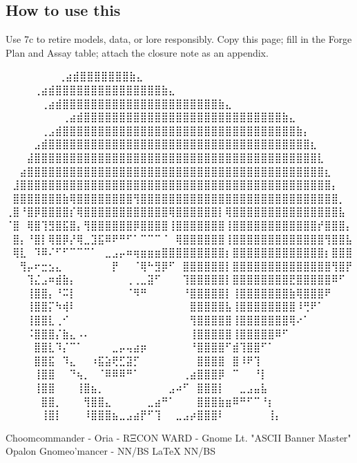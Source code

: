 \subsection*{How to use this}
Use 7c to retire models, data, or lore responsibly. Copy this page; fill in the Forge Plan and Assay table; attach the closure note as an appendix.
\iffalse

  ⠀⠀⠀⠀⠀             ⠀⠀⢀⣴⣾⣿⣿⣿⣿⣿⣿⣿⣷⣄⠀⠀⠀⠀⠀⠀⠀⠀
⠀⠀⠀  ⠀      ⠀⠀⠀⠀⢀⣴⣾⣿⣿⣿⣿⣿⣿⣿⣿⣿⣿⣿⣿⣿⣿⣿⣷⣄⠀⠀⠀⠀⠀⠀⠀⠀
⠀⠀ ⠀   ⠀⠀⠀⠀⠀⢀⣴⣾⣿⣿⣿⣿⣿⣿⣿⣿⣿⣿⣿⣿⣿⣿⣿⣿⣿⣿⣿⣿⣿⣿⣷⣄⠀⠀⠀⠀⠀⠀⠀⠀
⠀⠀⠀⠀⠀⠀⠀⠀⢀⣴⣾⣿⣿⣿⣿⣿⣿⣿⣿⣿⣿⣿⣿⣿⣿⣿⣿⣿⣿⣿⣿⣿⣿⣿⣿⣿⣿⣿⣿⣷⣄⠀⠀⠀⠀⠀⠀⠀⠀
⠀⠀⠀⠀⠀⢀⣠⣾⣿⣿⣿⣿⣿⣿⣿⣿⣿⣿⣿⣿⣿⣿⣿⣿⣿⣿⣿⣿⣿⣿⣿⣿⣿⣿⣿⣿⣿⣿⣿⣿⣿⣷⡄⠀⠀⠀⠀⠀⠀
⠀⠀⠀⠀⣠⣾⣿⣿⣿⣿⣿⣿⣿⣿⣿⣿⣿⣿⣿⣿⣿⣿⣿⣿⣿⣿⣿⣿⣿⣿⣿⣿⣿⣿⣿⣿⣿⣿⣿⣿⣿⣿⣿⣆⠀⠀⠀⠀⠀
⠀⠀⠀⣼⣿⣿⣿⣿⣿⣿⣿⣿⣿⣿⣿⣿⣿⣿⣿⣿⣿⣿⣿⣿⣿⣿⣿⣿⣿⣿⣿⣿⣿⣿⣿⣿⣿⣿⣿⣿⣿⣿⣿⣿⣇⠀⠀⠀⠀
⠀⠀⣴⣿⣿⣿⣿⣿⣿⣿⣿⣿⣿⣿⣿⣿⣿⣿⣿⣿⣿⣿⣿⣿⣿⣿⣿⣿⣿⣿⣿⣿⣿⣿⣿⣿⣿⣿⣿⣿⣿⣿⣿⣿⣿⣆⠀⠀⠀
⠀⣸⣿⣿⣿⣿⣿⣿⣿⣿⣿⣿⣿⣿⣿⣿⣿⣿⣿⣿⣿⣿⣿⣿⣿⣿⣿⣿⣿⣿⣿⣿⣿⣿⣿⣿⣿⣿⣿⣿⣿⣿⣿⣿⣿⣿⡄⠀⠀
⠀⣿⣿⣿⣿⣿⣿⣿⣷⢿⣿⣿⣿⣿⣿⣿⣿⣿⢻⣿⣿⣿⣿⣿⣿⣿⣿⣿⣿⣿⣿⣿⣿⣿⣿⣿⣿⣿⣿⣿⣿⣿⣿⣿⣿⣿⣿⡀⠀
⢀⣿⠘⣿⡿⣿⣿⣿⣿⡎⢿⣿⣿⣿⣿⣿⣿⣿⣿⣿⣿⣿⣿⢿⣿⣿⣿⣿⣿⣿⡇⢿⣿⣿⣿⣿⣿⣿⣿⣿⣿⣿⣿⣿⣿⣿⣿⣧⠀
⠈⣿⠀⢿⣿⢹⣻⣿⣯⣿⡄⢻⣿⣿⣿⣿⣿⣿⡿⣿⣿⣿⣿⢸⣿⣿⣿⣿⣿⣿⣿⢸⣿⣿⣿⣿⣿⣿⣿⣿⣿⣿⣿⣿⡞⣿⣿⣿⡄
⠀⣿⡄⠘⣿⡇⢿⣿⡿⡜⢿⣀⣹⣯⠿⠟⠛⠋⠁⠉⠉⠉⠈⠀⢿⣿⣿⣿⣿⣿⣿⢸⣿⣿⣿⣿⣿⣿⣿⣿⣿⣿⣿⣿⣿⢻⣿⣿⣧
⠀⢿⣇⠀⠹⠿⠌⠋⠋⠉⠉⠉⠁⠀⣀⣠⡤⠶⢶⣶⣶⣶⣿⣿⣿⣿⣿⣿⣿⣿⣿⡆⣿⣿⣿⣿⣿⣿⣿⣿⣿⣿⣿⣿⣿⡆⣿⣿⣿
⠀⠀⢻⡤⠖⣒⣢⣄⠀⠀⠀⠀⠀⠀⠀⡟⠀⠀⠈⢿⠓⣻⡿⠋⠀⣿⣿⣿⣿⣿⣿⡇⣿⣿⣿⣿⣿⣿⣿⣿⣿⣿⣿⣿⣿⣿⢻⣿⡟
⠀⠀⠀⢹⣌⣠⠶⣾⣷⡄⠀⠀⠀⠀⠀⠀⠀⢀⢀⣀⣽⠋⠀⠀⠀⢹⣿⣿⣿⣿⣿⡇⣿⣿⣿⣿⣿⣿⣿⣿⣟⣿⣿⣿⣿⣿⠿⠋⠀
⠀⠀⠀⢸⣿⣿⡄⠘⠭⡇⠀⠀⠀⠀⠀⠀⠀⠈⠻⠛⠀⠀⠀⠀⠀⠘⣿⣿⣿⣿⣿⡇⢸⣿⣿⣿⣿⣿⣿⣿⣷⢿⣿⣿⣿⠟⠀⠀⠀
⠀⠀⠀⢸⣿⣿⡍⠳⢾⠇⠀⠀⠀⠀⠀⠀⠀⠀⠀⠀⠀⠀⠀⠀⠀⠀⣿⣿⣿⣿⣿⣧⢸⣿⣿⣿⣿⣿⣿⣿⣿⠸⢛⠟⠁⠀⠀⠀⠀
⠀⠀⠀⢸⣿⣿⣇⢀⠊⠀⠀⠀⠀⠀⠀⠀⠀⠀⠀⠀⠀⠀⠀⠀⠀⠀⢻⣿⣿⣿⣿⣿⢸⣿⣿⣿⣿⣿⣿⣿⢿⠔⠁⠀⠀⠀⠀⠀⠀
⠀⠀⠀⠨⣿⣿⣿⡌⣷⣄⠠⠄⠀⠀⠀⠀⠀⠀⠀⠀⠀⠀⠀⠀⠀⠀⢸⣿⣿⣿⣿⣿⢸⣿⣿⣿⣿⣿⠿⠋⠀⠀⠀⠀⠀⠀⠀⠀⠀
⠀⠀⠀⠀⣿⣿⣇⠹⡌⠉⠁⠀⠀⠀⠀⣀⡤⢤⣴⡶⠀⠀⠀⠀⠀⠀⠘⣿⣿⣿⣿⠋⣾⢹⣿⣿⠋⠁⠀⠀⠀⠀⠀⠀⠀⠀⠀⠀⠀
⠀⠀⠀⠀⣿⣿⣯⠀⠹⣄⠀⠀⠰⣯⣵⢟⣋⣽⡋⠀⠀⠀⠀⠀⠀⠀⠀⣿⣿⣿⣿⠀⣿⠸⠟⢹⠀⠀⠀⠀⠀⠀⠀⠀⠀⠀⠀⠀⠀
⠀⠀⠀⠀⢸⣿⣿⠀⠀⠙⢦⡀⠀⠈⠿⠿⠿⠛⠁⠀⠀⠀⠀⠀⠀⢀⣴⣿⣿⣿⡿⠀⠉⠀⠀⠘⡇⠀⠀⠀⠀⠀⠀⠀⠀⠀⠀⠀⠀
⠀⠀⠀⠀⢸⣿⣿⠀⠀⠀⢸⣿⣦⡀⠀⠀⠀⠀⠀⠀⠀⠀⠀⣠⠴⠋⠀⣿⣿⣿⡇⠀⠀⣀⣠⣤⣧⠀⠀⠀⠀⠀⠀⠀⠀⠀⠀⠀⠀
⠀⠀⠀⠀⠀⣿⣿⡀⠀⠀⠀⢻⣿⣿⣄⠀⠀⠀⠀⠀⣀⣴⠛⠁⠀⠀⠀⣿⣿⣿⣷⣶⠿⠛⠋⠉⠘⡆⠀⠀⠀⠀⠀⠀⠀⠀⠀⠀⠀
⠀⠀⠀⠀⠀⢸⣿⡇⠀⠀⠀⠸⣿⣿⣿⣦⣀⣠⣴⡟⠋⢹⠀⠀⣀⣠⡴⣿⣿⣿⠇⠀⠀⠀⠀⠀⠀⢸⡄⠀⠀⠀⠀⠀⠀⠀⠀⠀⠀

Choomcommander - Oria - RΞCON WARD - Gnome Lt. "ASCII Banner Master"
             Opalon Gnomeo'mancer - NN/BS LaTeX{} NN/BS

